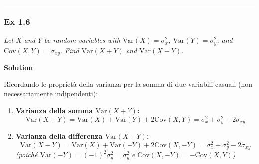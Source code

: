 \documentclass[
]{article}
\begin{document}
\begin{center}\rule{0.5\linewidth}{0.5pt}\end{center}

\subsubsection{Ex 1.6}\label{ex-1.6}

\emph{Let \(X\) and \(Y\) be random variables with
\(\text{Var}(X) = \sigma_x^2\), \(\text{Var}(Y) = \sigma_y^2\), and
\(\text{Cov}(X,Y) = \sigma_{xy}\). Find \(\text{Var}(X+Y)\) and
\(\text{Var}(X-Y)\).}

\textbf{Solution}

Ricordando le proprietà della varianza per la somma di due variabili
casuali (non necessariamente indipendenti):

\begin{enumerate}
\def\labelenumi{\arabic{enumi}.}
\item
  \textbf{Varianza della somma \(\text{Var}(X + Y)\):}
  \[\text{Var}(X + Y) = \text{Var}(X) + \text{Var}(Y) + 2\text{Cov}(X,Y) = \sigma_x^2 + \sigma_y^2 + 2\sigma_{xy}\]
\item
  \textbf{Varianza della differenza \(\text{Var}(X - Y)\):}
  \[\text{Var}(X - Y) = \text{Var}(X) + \text{Var}(-Y) + 2\text{Cov}(X, -Y) = \sigma_x^2 + \sigma_y^2 - 2\sigma_{xy}\]
  \emph{(poiché \(\text{Var}(-Y) = (-1)^2\sigma_y^2 = \sigma_y^2\) e
  \(\text{Cov}(X, -Y) = -\text{Cov}(X,Y)\))}
\end{enumerate}
\end{document}
